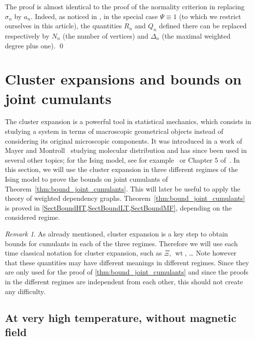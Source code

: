 \documentclass{amsart}
\DeclareMathOperator\wt{wt}
\numberwithin{equation}{section}
\theoremstyle{remark}
\newtheorem{remark}[theorem]{Remark}
\renewenvironment{proof}[1][Proof]{\begin{trivlist}
\item[\hskip \labelsep {\bfseries #1:}]}{\qed\end{trivlist}}
\begin{document}
\begin{proof}
The proof is almost identical to the proof of the normality criterion in \cite[Section 4.3]{Valentin} replacing $\sigma_n$ by $a_n$.
Indeed, as noticed in \cite[Section 4.3]{Valentin}, in the special case $\Psi \equiv 1$ (to which we restrict ourselves in this article),
the quantities $R_n$ and $Q_n$ defined there can be replaced respectively by $N_n$ (the number of vertices)
and $\Delta_n$ (the maximal weighted degree plus one).
\end{proof}


\section{Cluster expansions and bounds on joint cumulants}
\label{sec:cluster}

The cluster expansion is a powerful tool in statistical mechanics, which consists in studying a system in terms of macroscopic geometrical objects instead of considering its original microscopic components. It was introduced in a work of Mayer and Montroll~\cite{Mayer} studying molecular distribution and has since been used in several other topics;
for the Ising model, see for example~\cite{Farrell} or Chapter $5$ of~\cite{Velenik}. In this section, we will use the cluster expansion in three different regimes of the Ising model to prove the bounds on joint cumulants of Theorem~\ref{thm:bound_joint_cumulants}. This will later be useful to apply the theory of weighted dependency graphs.
Theorem~\ref{thm:bound_joint_cumulants} is proved in \cref{SectBoundHT,SectBoundLT,SectBoundMF},
depending on the considered regime.




\begin{remark}
  As already mentioned, cluster expansion is a key step to obtain bounds for cumulants
  in each of the three regimes.
  Therefore we will use each time classical notation for cluster expansion,
  such as $\Xi$, $\wt$, \dots
  Note however that these quantities may have different meanings in different regimes.
  Since they are only used for the proof of \cref{thm:bound_joint_cumulants}
  and since the proofs in the different regimes are independent from each other,
  this should not create any difficulty.
\end{remark}




\subsection{At very high temperature, without magnetic field}
\label{Sect:CE_HT}
\end{document}
